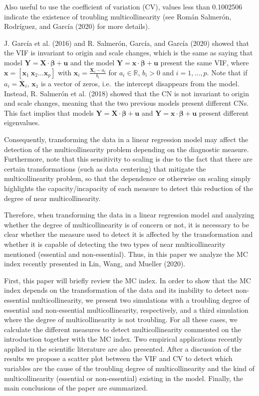 Also useful to use the coefficient of variation (CV), values less than 0.1002506 indicate the existence of troubling multicollinearity (see Román Salmerón, Rodríguez, and García (2020) for more details).

J. García et al. (2016) and R. Salmerón, García, and García (2020) showed that the VIF is invariant to origin and scale changes, which is the same as saying that model \(\mathbf{Y} = \mathbf{X} \cdot \boldsymbol{\beta} + \mathbf{u}\) and the model \(\mathbf{Y} = \mathbf{x} \cdot \boldsymbol{\beta} + \mathbf{u}\) present the same VIF, where \(\mathbf{x} = [\mathbf{x}_{1} \ \mathbf{x}_{2} \dots \mathbf{x}_{p}]\) with \(\mathbf{x}_{i} = \frac{\mathbf{X}_{i}-a_{i}}{b_{i}}\) for \(a_{i} \in \mathbb{R}\), \(b_{i}>0\) and \(i=1,\dots,p\). Note that if \(a_{i} = \overline{\mathbf{X}}_{i}\), \(\mathbf{x}_{1}\) is a vector of zeros, i.e.~the intercept disappears from the model. Instead, R. Salmerón et al. (2018) showed that the CN is not invariant to origin and scale changes, meaning that the two previous models present different CNs. This fact implies that models \(\mathbf{Y} = \mathbf{X} \cdot \boldsymbol{\beta} + \mathbf{u}\) and \(\mathbf{Y} = \mathbf{x} \cdot \boldsymbol{\beta} + \mathbf{u}\) present different eigenvalues.

Consequently, transforming the data in a linear regression model may affect the detection of the multicollinearity problem depending on the diagnostic measure. Furthermore, note that this sensitivity to scaling is due to the fact that there are certain transformations (such as data centering) that mitigate the multicollinearity problem, so that the dependence or otherwise on scaling simply highlights the capacity/incapacity of each measure to detect this reduction of the degree of near multicollinearity.

Therefore, when transforming the data in a linear regression model and analyzing whether the degree of multicollinearity is of concern or not, it is necessary to be clear whether the measure used to detect it is affected by the transformation and whether it is capable of detecting the two types of near multicollinearity mentioned (essential and non-essential). Thus, in this paper we analyze the MC index recently presented in Lin, Wang, and Mueller (2020).

First, this paper will briefly review the MC index. In order to show that the MC index depends on the transformation of the data and its inability to detect non-essential multicollinearity, we present two simulations with a troubling degree of essential and non-essential multicollinearity, respectively, and a third simulation where the degree of multicollinearity is not troubling. For all these cases, we calculate the different measures to detect multicollinearity commented on the introduction together with the MC index. Two empirical applications recently applied in the scientific literature are also presented. After a discussion of the results we propose a scatter plot between the VIF and CV to detect which variables are the cause of the troubling degree of multicollinearity and the kind of multicollinearity (essential or non-essential) existing in the model. Finally, the main conclusions of the paper are summarized.


